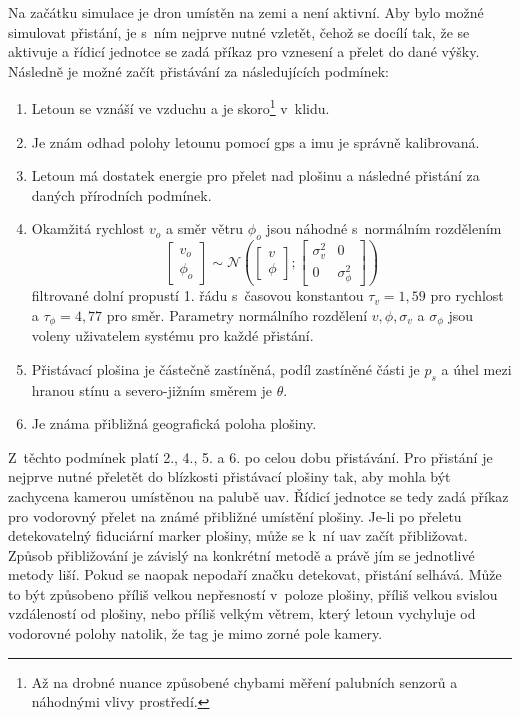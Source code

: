     Na začátku simulace je dron umístěn na zemi a není aktivní. Aby bylo možné simulovat přistání, je s~ním nejprve nutné vzletět, čehož se docílí tak, že se aktivuje a řídicí jednotce se zadá příkaz pro vznesení a přelet do dané výšky. Následně je možné začít přistávání za následujících podmínek:
    \begin{enumerate}
        \item Letoun se vznáší ve vzduchu a je skoro\footnote[1]{Až na drobné nuance způsobené chybami měření palubních senzorů a náhodnými vlivy prostředí.} v~klidu.
        \item Je znám odhad polohy letounu pomocí \acrshort{gps} a \acrshort{imu} je správně kalibrovaná.
        \item Letoun má dostatek energie pro přelet nad plošinu a následné přistání za daných přírodních podmínek.
        \item Okamžitá rychlost $v_o$ a směr větru $\phi_o$ jsou náhodné s~normálním rozdělením $$\begin{bmatrix}
            v_o\\
            \phi_o
        \end{bmatrix} \sim \mathcal{N}\left(\begin{bmatrix}
            v\\
            \phi
        \end{bmatrix}; \begin{bmatrix}
            \sigma_v^2 & 0\\
            0          & \sigma_\phi^2
        \end{bmatrix}\right)$$ filtrované dolní propustí 1. řádu s~časovou konstantou $\tau_v = 1{,}59$ pro rychlost a $\tau_\phi = 4{,}77$ pro směr.
        Parametry normálního rozdělení $v, \phi, \sigma_v$ a $\sigma_\phi$ jsou voleny uživatelem systému pro každé přistání.
        \item Přistávací plošina je částečně zastíněná, podíl zastíněné části je $p_s$ a úhel mezi hranou stínu a severo-jižním směrem je $\theta$.
        \item Je známa přibližná geografická poloha plošiny.
    \end{enumerate}
    Z~těchto podmínek platí 2., 4., 5. a 6. po celou dobu přistávání. Pro přistání je nejprve nutné přeletět do blízkosti přistávací plošiny tak, aby mohla být zachycena kamerou umístěnou na palubě \acrshort{uav}. Řídicí jednotce se tedy zadá příkaz pro vodorovný přelet na známé přibližné umístění plošiny. Je-li po přeletu detekovatelný fiduciární marker plošiny, může se k~ní \acrshort{uav} začít přibližovat. Způsob přibližování je závislý na konkrétní metodě a právě jím se jednotlivé metody liší. Pokud se naopak nepodaří značku detekovat, přistání selhává. Může to být způsobeno příliš velkou nepřesností v~poloze plošiny, příliš velkou svislou vzdáleností od plošiny, nebo příliš velkým větrem, který letoun vychyluje od vodorovné polohy natolik, že tag je mimo zorné pole kamery.

